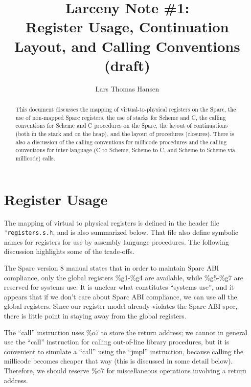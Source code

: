


\title{Larceny Note \#1: \\
       Register Usage, Continuation Layout, and Calling Conventions \\
       {\tenrm (draft)}}
\author{Lars Thomas Hansen}


\maketitle

\begin{abstract}
This document discusses the mapping of virtual-to-physical registers
on the Sparc, the use of non-mapped Sparc registers, the use of stacks
for Scheme and C, the calling conventions for Scheme and C procedures
on the Sparc, the layout of continuations (both in the stack and on
the heap), and the layout of procedures (closures). There is also a
discussion of the calling conventions for millicode procedures and the
calling conventions for inter-language (C to Scheme, Scheme to C, and
Scheme to Scheme via millicode) calls.
\end{abstract}

\section{Register Usage}

The mapping of virtual to physical registers is defined in the header
file \verb+"registers.s.h+, and is also summarized below. That file
also define symbolic names for registers for use by assembly language
procedures.  The following discussion highlights some of the
trade-offs.

The Sparc version 8 manual states that in order to maintain Sparc ABI
compliance, only the global registers \%g1-\%g4 are available, while
\%g5-\%g7 are reserved for systems use. It is unclear what constitutes
``systems use'', and it appears that if we don't care about Sparc ABI
compliance, we can use all the global registers. Since our register
model already violates the Sparc ABI spec, there is little point in
staying away from the global registers.

The ``call'' instruction uses \%o7 to store the return address; we
cannot in general use the ``call'' instruction for calling out-of-line
library procedures, but it is convenient to simulate a ``call'' using
the ``jmpl'' instruction, because calling the millicode becomes
cheaper that way (this is discussed in some detail below).  Therefore,
we should reserve \%o7 for miscellaneous operations involving a return
address.

